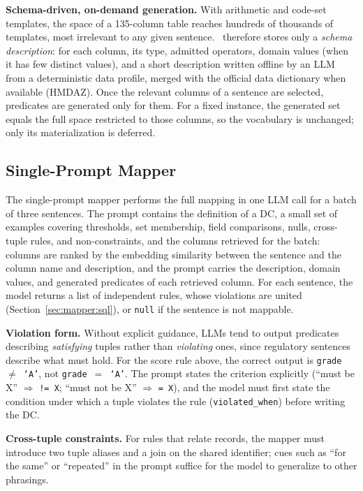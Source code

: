 \smallskip\noindent\textbf{Schema-driven, on-demand generation.}
With arithmetic and code-set templates, the space of a 135-column table reaches hundreds of thousands of templates, most irrelevant to any given sentence. \system\ therefore stores only a \emph{schema description}: for each column, its type, admitted operators, domain values (when it has few distinct values), and a short description written offline by an LLM from a deterministic data profile, merged with the official data dictionary when available (HMDAZ). Once the relevant columns of a sentence are selected, predicates are generated only for them. For a fixed instance, the generated set equals the full space restricted to those columns, so the vocabulary is unchanged; only its materialization is deferred.

\subsection{Single-Prompt Mapper}
\label{sec:mapper:llm}

The single-prompt mapper performs the full mapping in one LLM call for a batch of three sentences. The prompt contains the definition of a DC, a small set of examples covering thresholds, set membership, field comparisons, nulls, cross-tuple rules, and non-constraints, and the columns retrieved for the batch: columns are ranked by the embedding similarity between the sentence and the column name and description, and the prompt carries the description, domain values, and generated predicates of each retrieved column. For each sentence, the model returns a list of independent rules, whose violations are united (Section~\ref{sec:mapper:sql}), or \texttt{null} if the sentence is not mappable.

\smallskip\noindent\textbf{Violation form.}
Without explicit guidance, LLMs tend to output predicates describing \emph{satisfying} tuples rather than \emph{violating} ones, since regulatory sentences describe what must hold. For the score rule above, the correct output is \texttt{grade $\neq$ `A'}, not \texttt{grade $=$ `A'}. The prompt states the criterion explicitly (``must be X'' $\Rightarrow$ \texttt{!= X}; ``must not be X'' $\Rightarrow$ \texttt{= X}), and the model must first state the condition under which a tuple violates the rule (\texttt{violated\_when}) before writing the DC.

\smallskip\noindent\textbf{Cross-tuple constraints.}
For rules that relate records, the mapper must introduce two tuple aliases and a join on the shared identifier; cues such as ``for the same'' or ``repeated'' in the prompt suffice for the model to generalize to other phrasings.


